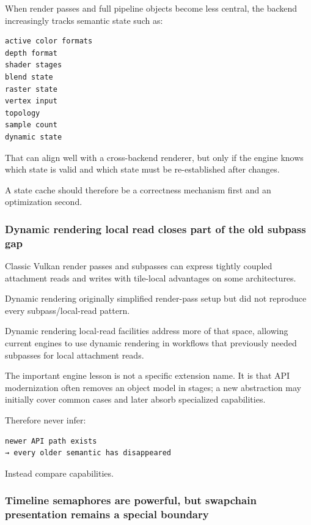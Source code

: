 When render passes and full pipeline objects become less central, the backend increasingly tracks semantic state such as:

\begin{verbatim}
active color formats
depth format
shader stages
blend state
raster state
vertex input
topology
sample count
dynamic state
\end{verbatim}

That can align well with a cross-backend renderer, but only if the engine knows which state is valid and which state must be re-established after changes.

A state cache should therefore be a correctness mechanism first and an optimization second.

\subsubsection{Dynamic rendering local read closes part of the old subpass gap}\label{05-engine-i-ch023-dynamic-rendering-local-read-closes-part-of-the-old-subpass-gap}

Classic Vulkan render passes and subpasses can express tightly coupled attachment reads and writes with tile-local advantages on some architectures.

Dynamic rendering originally simplified render-pass setup but did not reproduce every subpass/local-read pattern.

Dynamic rendering local-read facilities address more of that space, allowing current engines to use dynamic rendering in workflows that previously needed subpasses for local attachment reads.

The important engine lesson is not a specific extension name. It is that API modernization often removes an object model in stages; a new abstraction may initially cover common cases and later absorb specialized capabilities.

Therefore never infer:

\begin{verbatim}
newer API path exists
→ every older semantic has disappeared
\end{verbatim}

Instead compare capabilities.

\subsubsection{Timeline semaphores are powerful, but swapchain presentation remains a special boundary}\label{05-engine-i-ch023-timeline-semaphores-are-powerful-but-swapchain-presentation-remains-a-special-boundary}

